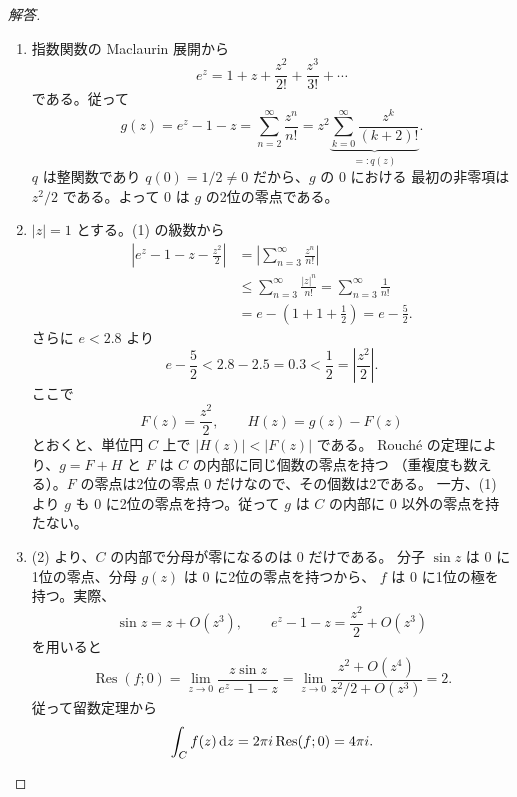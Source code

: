 \begin{proof}[解答]
\begin{enumerate}
  \item[(1)] 指数関数の Maclaurin 展開から
  \[
  e^z=1+z+\frac{z^2}{2!}+\frac{z^3}{3!}+\cdots
  \]
  である。従って
  \[
  g(z)=e^z-1-z
      =\sum_{n=2}^{\infty}\frac{z^n}{n!}
      =z^2\underbrace{\sum_{k=0}^{\infty}\frac{z^k}{(k+2)!}}_{=:q(z)}.
  \]
  $q$ は整関数であり $q(0)=1/2\ne0$ だから、$g$ の $0$ における
  最初の非零項は $z^2/2$ である。よって $0$ は $g$ の2位の零点である。

  \item[(2)] $|z|=1$ とする。(1) の級数から
  \begin{align*}
  \left|e^z-1-z-\frac{z^2}{2}\right|
  &=\left|\sum_{n=3}^{\infty}\frac{z^n}{n!}\right|\\
  &\le\sum_{n=3}^{\infty}\frac{|z|^n}{n!}
  =\sum_{n=3}^{\infty}\frac1{n!}\\
  &=e-\left(1+1+\frac12\right)
  =e-\frac52.
  \end{align*}
  さらに $e<2.8$ より
  \[
  e-\frac52<2.8-2.5=0.3<\frac12
  =\left|\frac{z^2}{2}\right|.
  \]
  ここで
  \[
  F(z)=\frac{z^2}{2},\qquad
  H(z)=g(z)-F(z)
  \]
  とおくと、単位円 $C$ 上で $|H(z)|<|F(z)|$ である。
  Rouch\'e の定理により、$g=F+H$ と $F$ は $C$ の内部に同じ個数の零点を持つ
  （重複度も数える）。$F$ の零点は2位の零点 $0$ だけなので、その個数は2である。
  一方、(1) より $g$ も $0$ に2位の零点を持つ。従って $g$ は
  $C$ の内部に $0$ 以外の零点を持たない。

  \item[(3)] (2) より、$C$ の内部で分母が零になるのは $0$ だけである。
  分子 $\sin z$ は $0$ に1位の零点、分母 $g(z)$ は $0$ に2位の零点を持つから、
  $f$ は $0$ に1位の極を持つ。実際、
  \[
  \sin z=z+O(z^3),\qquad
  e^z-1-z=\frac{z^2}{2}+O(z^3)
  \]
  を用いると
  \[
  \operatorname{Res}(f;0)
  =\lim_{z\to0}\frac{z\sin z}{e^z-1-z}
  =\lim_{z\to0}\frac{z^2+O(z^4)}{z^2/2+O(z^3)}=2.
  \]
  従って留数定理から
  \[
  \int_Cf(z)\,\mathrm{d} z=2\pi i\operatorname{Res}(f;0)=4\pi i.
  \]
\end{enumerate}
\end{proof}

